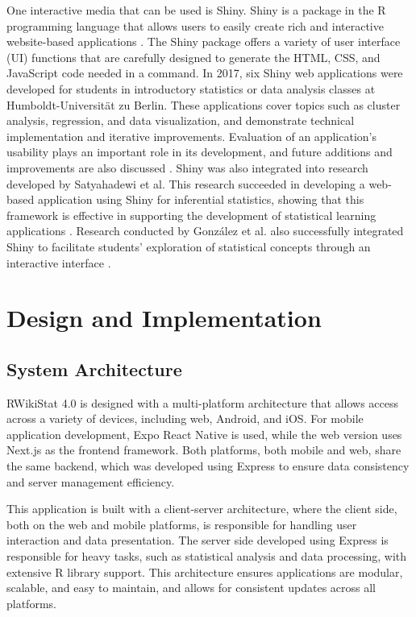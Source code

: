 \documentclass[conference,a4paper]{IEEEtran}
\begin{document}
One interactive media that can be used is Shiny. Shiny is a package in the R
programming language that allows users to easily create rich and interactive
website-based applications \cite{b6}. The Shiny package offers a variety of
user interface (UI) functions that are carefully designed to generate the HTML,
CSS, and JavaScript code needed in a command. In 2017, six Shiny web
applications were developed for students in introductory statistics or data
analysis classes at Humboldt-Universität zu Berlin. These applications cover
topics such as cluster analysis, regression, and data visualization, and
demonstrate technical implementation and iterative improvements. Evaluation of
an application's usability plays an important role in its development, and
future additions and improvements are also discussed \cite{b7}. Shiny was also
integrated into research developed by Satyahadewi et al. This research
succeeded in developing a web-based application using Shiny for inferential
statistics, showing that this framework is effective in supporting the
development of statistical learning applications \cite{b9}. Research conducted
by González et al. also successfully integrated Shiny to facilitate students'
exploration of statistical concepts through an interactive interface \cite{b9}.

\section{Design and Implementation}
\label{sect:d_and_i}

\subsection{System Architecture}
RWikiStat 4.0 is designed with a multi-platform architecture that allows access
across a variety of devices, including web, Android, and iOS. For mobile
application development, Expo React Native is used, while the web version uses
Next.js as the frontend framework. Both platforms, both mobile and web, share
the same backend, which was developed using Express to ensure data consistency
and server management efficiency.

This application is built with a client-server architecture, where the client
side, both on the web and mobile platforms, is responsible for handling user
interaction and data presentation. The server side developed using Express is
responsible for heavy tasks, such as statistical analysis and data processing,
with extensive R library support. This architecture ensures applications are
modular, scalable, and easy to maintain, and allows for consistent updates
across all platforms.
\end{document}

